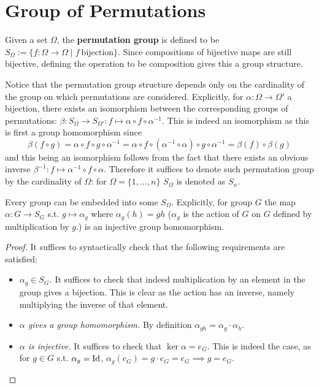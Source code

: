 \documentclass{article}
\begin{document}
\section{Group of Permutations}

\begin{definition}
    Given a set $\Omega$, the \textbf{permutation group} is defined to be $S_{\Omega} := \{f: \Omega \to \Omega \mid f\ \text{bijection}\}$. Since compositions of bijective maps are still bijective, defining the operation to be composition gives this a group structure.
\end{definition}

\begin{remark}
    Notice that the permutation group structure depends only on the cardinality of the group on which permutations are considered. Explicitly, for $\alpha: \Omega \to \Omega'$ a bijection, there exists an isomorphism between the corresponding groups of permutations: $\beta: S_{\Omega} \to S_{\Omega'}: f \mapsto \alpha \circ f \circ \alpha^{-1}$. This is indeed an isomorphism as this is first a group homomorphism since
    \[
        \beta(f \circ g) = \alpha \circ f \circ g \circ \alpha^{-1} = \alpha \circ f \circ (\alpha^{-1} \circ \alpha) \circ g \circ \alpha^{-1} = \beta(f) \circ \beta(g)
    \]
    and this being an isomorphism follows from the fact that there exists an obvious inverse $\beta^{-1}: f \mapsto \alpha^{-1} \circ f \circ \alpha$. Therefore it suffices to denote such permutation group by the cardinality of $\Omega$: for $\Omega = \{1, \dots, n\}$ $S_{\Omega}$ is denoted as $S_n$.
\end{remark}

\begin{proposition}[Cayley]
    Every group can be embedded into some $S_{\Omega}$. Explicitly, for group $G$ the map $\alpha: G \to S_G$ s.t. $g \mapsto \alpha_g$ where $\alpha_g(h) = gh$ ($\alpha_g$ is the action of $G$ on $G$ defined by multiplication by $g$.) is an injective group homomorphism.
\end{proposition}

\begin{proof}
    It suffices to syntactically check that the following requirements are satisfied:
    \begin{itemize}
        \item \emph{$\alpha_g \in S_G$.} It suffices to check that indeed multiplication by an element in the group gives a bijection. This is clear as the action has an inverse, namely multiplying the inverse of that element. 
        \item \emph{$\alpha$ gives a group homomorphism.} By definition $\alpha_{gh} = \alpha_g \cdot \alpha_h$.
        \item \emph{$\alpha$ is injective.} It suffices to check that $\ker \alpha = e_G$. This is indeed the case, as for $g \in G$ s.t. $\alpha_g = \mathrm{Id}$, $\alpha_g(e_G) = g \cdot e_G = e_G \implies g = e_G$.
    \end{itemize}
\end{proof}
\end{document}
